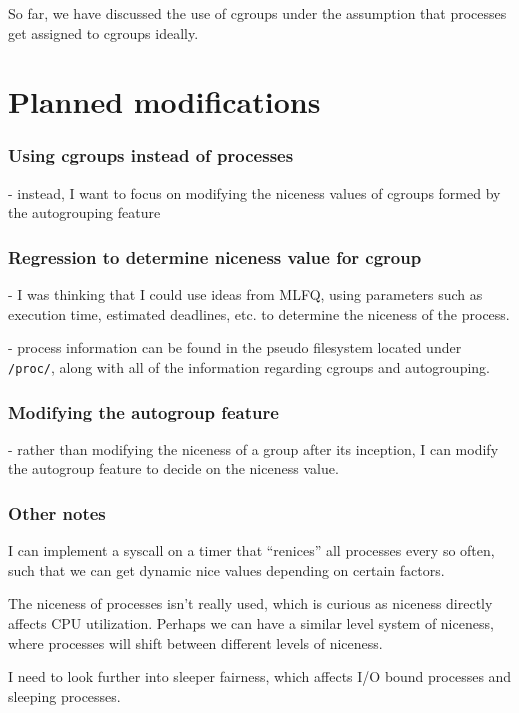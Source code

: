 \documentclass[12pt]{article}
\begin{document}
So far, we have discussed the use of cgroups under the assumption that processes get assigned to cgroups ideally.

\section*{Planned modifications}

\subsubsection*{Using cgroups instead of processes}

- instead, I want to focus on modifying the niceness values of cgroups formed by the autogrouping feature

\subsubsection*{Regression to determine niceness value for cgroup}

- I was thinking that I could use ideas from MLFQ, using parameters such as execution time, estimated deadlines, etc. to determine the niceness of the process.

- process information can be found in the pseudo filesystem located under \texttt{/proc/}, along with all of the information regarding cgroups and autogrouping.

\subsubsection*{Modifying the autogroup feature}

- rather than modifying the niceness of a group after its inception, I can modify the autogroup feature to decide on the niceness value.

\subsubsection*{Other notes}

I can implement a syscall on a timer that ``renices'' all processes every so often, such that we can get dynamic nice values depending on certain factors. 

The niceness of processes isn't really used, which is curious as niceness directly affects CPU utilization. Perhaps we can have a similar level system of niceness, where processes will shift between different levels of niceness. 

I need to look further into sleeper fairness, which affects I/O bound processes and sleeping processes.
\end{document}
